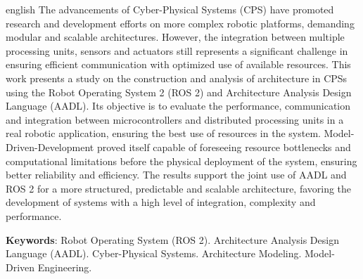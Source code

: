 \begin{resumo}[Abstract]
\begin{otherlanguage*}{english}
The advancements of Cyber-Physical Systems (CPS) have promoted research and development efforts on more complex robotic platforms, demanding modular and scalable architectures. However, the integration between multiple processing units, sensors and actuators still represents a significant challenge in ensuring efficient communication with optimized use of available resources.
This work presents a study on the construction and analysis of architecture in CPSs  using the Robot Operating System 2 (ROS 2) and Architecture Analysis Design Language (AADL). Its objective is to evaluate the performance, communication and integration between microcontrollers and distributed processing units in a real robotic application, ensuring the best use of resources in the system.
Model-Driven-Development proved itself capable of foreseeing resource bottlenecks and computational limitations before the physical deployment of the system, ensuring better reliability and efficiency. The results support the joint use of AADL and ROS 2 for a more structured, predictable and scalable architecture, favoring the development of systems with a high level of integration, complexity and performance. 
    
\textbf{Keywords}: Robot Operating System (ROS 2). Architecture Analysis Design Language (AADL). Cyber-Physical Systems. Architecture Modeling. Model-Driven Engineering.
\end{otherlanguage*}
\end{resumo}
